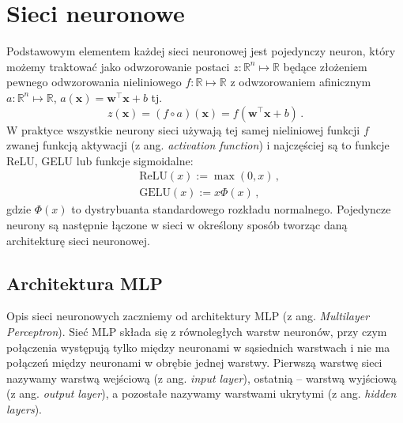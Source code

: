 \documentclass{myclass}
\begin{document}
\section{Sieci neuronowe}

Podstawowym elementem każdej sieci neuronowej jest pojedynczy neuron, który możemy traktować jako
odwzorowanie postaci \(z: \mathbb{R}^n \mapsto \mathbb{R}\) będące złożeniem pewnego odwzorowania
nieliniowego \(f:\mathbb{R} \mapsto \mathbb{R}\) z odwzorowaniem afinicznym \(a: \mathbb{R}^n
\mapsto \mathbb{R}\), \(a(\mathbf{x}) = \mathbf{w}^\top\mathbf{x} + b\) tj.
\begin{equation*}
    z(\mathbf{x}) = (f \circ a)(\mathbf{x}) = f\left(\mathbf{w}^\top\mathbf{x} + b\right)\,.
\end{equation*}
W praktyce wszystkie neurony sieci używają tej samej nieliniowej funkcji \(f\) zwanej funkcją
aktywacji (z ang. \textit{activation function}) i najczęściej są to funkcje ReLU, GELU lub funkcje
sigmoidalne:
\begin{equation*}
    \begin{split}
        &\text{ReLU}(x) := \max(0, x)\,,\\
        &\text{GELU}(x) := x\Phi(x)\,,
    \end{split}
\end{equation*}
gdzie \(\Phi(x)\) to dystrybuanta standardowego rozkładu normalnego. Pojedyncze neurony są następnie
łączone w sieci w określony sposób tworząc daną architekturę sieci neuronowej.

\subsection{Architektura MLP}

Opis sieci neuronowych zaczniemy od architektury MLP (z ang. \textit{Multilayer Perceptron}). Sieć
MLP składa się z równoległych warstw neuronów, przy czym połączenia występują tylko między neuronami
w sąsiednich warstwach i nie ma połączeń między neuronami w obrębie jednej warstwy. Pierwszą warstwę
sieci nazywamy warstwą wejściową (z ang. \textit{input layer}), ostatnią -- warstwą wyjściową (z
ang. \textit{output layer}), a pozostałe nazywamy warstwami ukrytymi (z ang. \textit{hidden
layers}).
\end{document}
